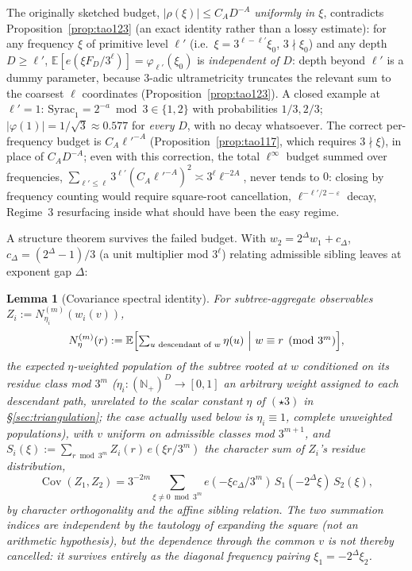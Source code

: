 \documentclass[11pt]{article}
\newtheorem{lemma}[theorem]{Lemma}
\theoremstyle{definition}
\theoremstyle{remark}
\DeclareMathOperator{\Cov}{Cov}
\begin{document}
The originally sketched budget, $|\rho(\xi)|\le C_A D^{-A}$
\emph{uniformly in $\xi$}, contradicts Proposition~\ref{prop:tao123}
(an exact identity rather than a lossy estimate): for any frequency $\xi$ of
primitive level $\ell'$ (i.e.\ $\xi=3^{\ell-\ell'}\xi_0$, $3\nmid\xi_0$)
and any depth $D\ge\ell'$, $\mathbb{E}[e(\xi F_D/3^\ell)] =
\varphi_{\ell'}(\xi_0)$ is \emph{independent of $D$}: depth beyond
$\ell'$ is a dummy parameter, because $3$-adic ultrametricity truncates
the relevant sum to the coarsest $\ell$ coordinates
(Proposition~\ref{prop:tao123}). A closed example at $\ell'=1$:
$\mathrm{Syrac}_1 = 2^{-a}\bmod 3 \in\{1,2\}$ with probabilities
$1/3,2/3$; $|\varphi(1)|=1/\sqrt3\approx 0.577$ for \emph{every} $D$,
with no decay whatsoever. The correct per-frequency budget is
$C_A\ell'^{-A}$ (Proposition~\ref{prop:tao117}, which requires
$3\nmid\xi$), in place of $C_AD^{-A}$; even with this correction, the total
$\ell^\infty$ budget summed over frequencies, $\sum_{\ell'\le \ell}
3^{\ell'}(C_A\ell'^{-A})^2 \asymp 3^\ell \ell^{-2A}$, never tends to
$0$: closing by frequency counting would require square-root
cancellation, $\ell^{-\ell'/2-\varepsilon}$ decay, Regime~3
resurfacing inside what should have been the easy regime.

A structure theorem survives the failed budget. With $w_2 =
2^\Delta w_1 + c_\Delta$, $c_\Delta=(2^\Delta-1)/3$ (a unit multiplier
mod $3^\ell$) relating admissible sibling leaves at exponent gap
$\Delta$:

\begin{lemma}[Covariance spectral identity]\label{lem:cov-spectral}
For subtree-aggregate observables $Z_i:=N_{\eta_i}^{(m)}(w_i(v))$,
\[
N_\eta^{(m)}(r):=\mathbb E\Bigl[\textstyle\sum_{u\text{ descendant of
}w}\eta(u)\ \Big|\ w\equiv r\pmod{3^m}\Bigr],
\]
the expected $\eta$-weighted population of the subtree rooted at $w$
conditioned on its residue class mod $3^m$ ($\eta_i:(\mathbb
N_+)^D\to[0,1]$ an arbitrary weight assigned to each descendant path,
unrelated to the scalar constant $\eta$ of $(\star3)$ in
\S\ref{sec:triangulation}; the case actually used below is
$\eta_i\equiv1$, complete unweighted populations), with $v$
uniform on admissible classes mod $3^{m+1}$, and $S_i(\xi):=\sum_{r
\bmod 3^m}Z_i(r)\,e(\xi r/3^m)$ the character sum of $Z_i$'s residue
distribution,
\[
  \Cov(Z_1,Z_2) = 3^{-2m}\sum_{\xi\ne 0 \bmod 3^m}
  e(-\xi c_\Delta/3^m)\, S_1(-2^\Delta\xi)\, S_2(\xi),
\]
by character orthogonality and the affine sibling relation. The two
summation indices are independent by the tautology of expanding the
square (not an arithmetic hypothesis), but the dependence through the
common $v$ is not thereby cancelled: it survives entirely as the
diagonal frequency pairing $\xi_1=-2^\Delta\xi_2$.
\end{lemma}
\end{document}
